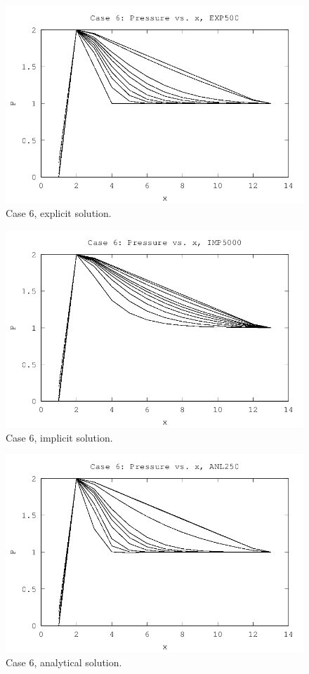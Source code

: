 \begin{figure}[H]
  \centering
  \includegraphics[]{../code/case61.png}
  \caption{Case 6, explicit solution.}
  \label{fig:case61}
\end{figure}

\begin{figure}[H]
  \centering
  \includegraphics[]{../code/case62.png}
  \caption{Case 6, implicit solution.}
  \label{fig:case62}
\end{figure}

\begin{figure}[H]
  \centering
  \includegraphics[]{../code/case63.png}
  \caption{Case 6, analytical solution.}
  \label{fig:case63}
\end{figure}


